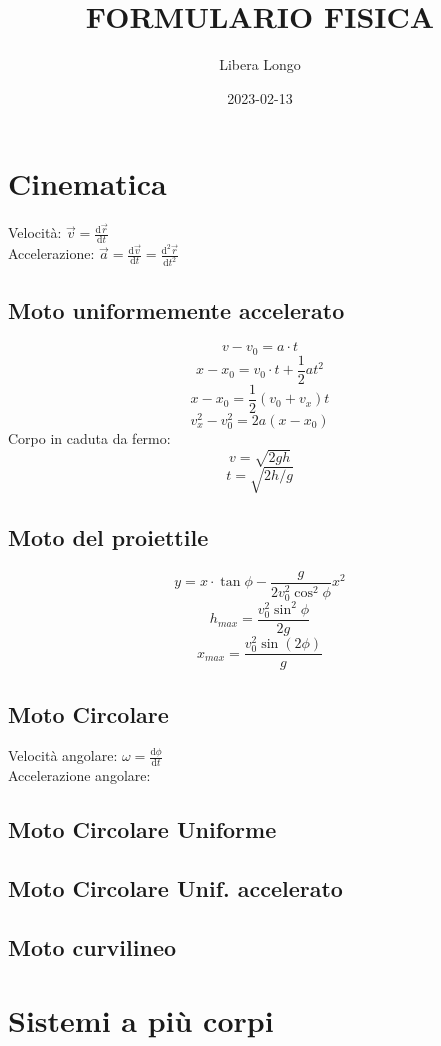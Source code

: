 \documentclass[70pt]{article}
\title{FORMULARIO FISICA}
\date{2023-02-13}
\author{Libera Longo}
\begin{document}
	\begin{small}
	\begin{multicols}{3}

\section{Cinematica}
		Velocità: $ \vec v = \frac{ \mathrm d \vec r }{ \mathrm d t } $ \\
		Accelerazione: $ \vec a = \frac{ \mathrm d \vec v }{ \mathrm d t } = \frac{ \mathrm d^2 \vec r }{ \mathrm d t^2 } $
	\subsection{Moto uniformemente accelerato}
		\[ v - v_0 = a \cdot t \]
		\[ x - x_0 = v_0 \cdot t + \frac{1}{2} a t^2 \]
		\[ x - x_0 = \frac{1}{2} (v_0 + v_x) t \]
		\[ v_x^2 - v_0^2 = 2 a (x - x_0) \]
		Corpo in caduta da fermo: \\
		\[ v = \sqrt{ 2 g h } \]
		\[ t = \sqrt{ 2h / g } \]
	\subsection{Moto del proiettile}
		\[ y = x \cdot \tan \phi - \frac{ g }{ 2 v_0^2 \cos^2 \phi } x^2 \]
		\[ h_{max} = \frac{ v_0^2 \sin^2 \phi }{ 2 g } \]
		\[ x_{max} = \frac{ v_0^2 \sin( 2 \phi ) }{ g } \]
	\subsection{Moto Circolare}
		Velocità angolare: $ \omega = \frac{ \mathrm d \phi }{ \mathrm d t } $ \\
		Accelerazione angolare: $  $
	\subsection{Moto Circolare Uniforme}
	\subsection{Moto Circolare Unif. accelerato}
	\subsection{Moto curvilineo}
\section{Sistemi a più corpi}

\end{multicols}
\end{small}
\end{document}
